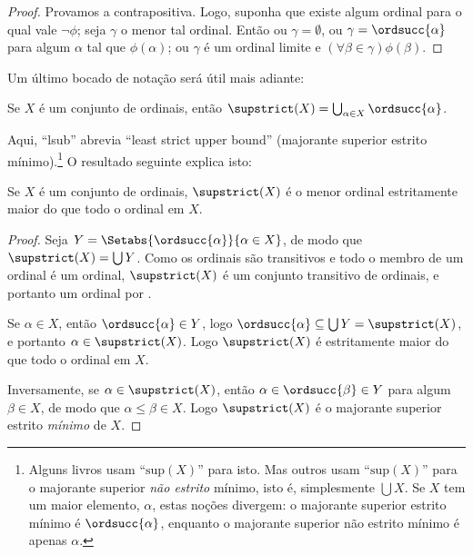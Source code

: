 \documentclass[../../../include/open-logic-section]{subfiles}
\begin{document}
\begin{proof}
Provamos a contrapositiva. Logo, suponha que existe algum ordinal para o qual
vale $\lnot\phi$; seja $\gamma$ o menor tal ordinal. Então ou
$\gamma = \emptyset$, ou $\gamma = \ordsucc{\alpha}$ para algum $\alpha$
tal que $\phi(\alpha)$; ou $\gamma$ é um ordinal limite e $(\forall
\beta \in \gamma)\phi(\beta)$.
\end{proof}
\noindent
Um último bocado de notação será útil mais adiante:

\begin{defn}
Se $X$ é um conjunto de ordinais, então $\supstrict(X) = \bigcup_{\alpha
\in X} \ordsucc{\alpha}$.
\end{defn}
\noindent
Aqui, ``lsub'' abrevia ``least strict upper bound'' (majorante superior estrito mínimo).\footnote{Alguns livros usam ``$\text{sup}(X)$'' para isto. Mas outros usam
``$\text{sup}(X)$'' para o majorante superior \emph{não estrito} mínimo, isto é,
simplesmente $\bigcup X$. Se $X$ tem um maior elemento, $\alpha$, estas
noções divergem: o majorante superior estrito mínimo é
$\ordsucc{\alpha}$, enquanto o majorante superior não estrito mínimo é
apenas $\alpha$.} O resultado seguinte explica isto:

\begin{prop}
Se $X$ é um conjunto de ordinais, $\supstrict(X)$ é o menor ordinal
estritamente maior do que todo o ordinal em $X$.
\end{prop}

\begin{proof}
Seja $Y = \Setabs{\ordsucc{\alpha}}{\alpha \in X}$, de modo que
$\supstrict(X) = \bigcup Y$. Como os ordinais são transitivos e todo o
membro de um ordinal é um ordinal, $\supstrict(X)$ é um conjunto transitivo
de ordinais, e portanto um ordinal por
. 

Se $\alpha \in X$, então $\ordsucc{\alpha} \in Y$, logo $\ordsucc{\alpha}
\subseteq \bigcup Y = \supstrict(X)$, e portanto $\alpha \in
\supstrict(X)$. Logo $\supstrict(X)$ é estritamente maior do que todo o
ordinal em $X$.

Inversamente, se $\alpha \in \supstrict(X)$, então $\alpha \in
\ordsucc{\beta} \in Y$ para algum $\beta \in X$, de modo que $\alpha \leq
\beta \in X$. Logo $\supstrict(X)$ é o majorante superior estrito
\emph{mínimo} de $X$.
\end{proof}
\end{document}

